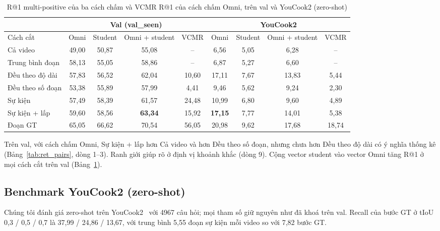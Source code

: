 \documentclass{IEEEtran}
\begin{document}
\begin{table}[t]
\caption{R@1 multi-positive của ba cách chấm và VCMR R@1 của cách chấm Omni, trên val và YouCook2 (zero-shot)}
\label{tab:ret_dev}
\setlength{\tabcolsep}{4pt}
\centering
\begin{tabular}{|l|c|c|c|c|c|c|c|c|}
\hline
 & \multicolumn{4}{c|}{Val (val\_seen)} & \multicolumn{4}{c|}{YouCook2} \\
\hline
Cách cắt & Omni & Student & Omni + student & VCMR & Omni & Student & Omni + student & VCMR \\
\hline
Cả video & 49,00 & 50,87 & 55,08 & -- & 6,56 & 5,05 & 6,28 & -- \\
Trung bình đoạn & 58,13 & 55,05 & 58,86 & -- & 6,87 & 5,27 & 6,60 & -- \\
Đều theo độ dài & 57,83 & 56,52 & 62,04 & 10,60 & 17,11 & 7,67 & 13,83 & 5,44 \\
Đều theo số đoạn & 53,38 & 55,89 & 57,99 & 4,41 & 9,46 & 5,62 & 9,24 & 2,30 \\
Sự kiện & 57,49 & 58,39 & 61,57 & 24,48 & 10,99 & 6,80 & 9,60 & 4,89 \\
Sự kiện + lấp & 59,60 & 58,56 & \textbf{63,34} & 15,92 & \textbf{17,15} & 7,77 & 14,01 & 5,38 \\
\hline
Đoạn GT & 65,05 & 66,62 & 70,54 & 56,05 & 20,98 & 9,62 & 17,68 & 18,74 \\
\hline
\end{tabular}
\end{table}

Trên val, với cách chấm Omni, Sự kiện + lấp hơn Cả video và hơn Đều theo số đoạn, nhưng chưa hơn Đều theo độ dài có ý nghĩa thống kê (Bảng~\ref{tab:ret_pairs}, dòng 1--3). Ranh giới giúp rõ ở định vị khoảnh khắc (dòng 9). Cộng vector student vào vector Omni tăng R@1 ở mọi cách cắt trên val (Bảng~\ref{tab:ret_dev}).

\subsection{Benchmark YouCook2 (zero-shot)}
Chúng tôi đánh giá zero-shot trên YouCook2~\cite{youcook2} với 4967 câu hỏi; mọi tham số giữ nguyên như đã khoá trên val. Recall của bước GT ở tIoU 0,3 / 0,5 / 0,7 là 37,99 / 24,86 / 13,67, với trung bình 5,55 đoạn sự kiện mỗi video so với 7,82 bước GT.
\end{document}
